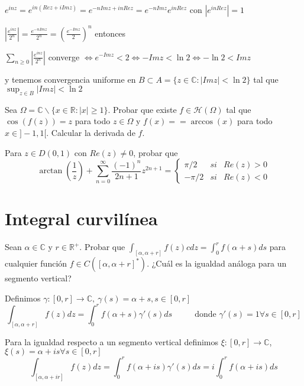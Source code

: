 $e^{inz} = e^{in(Rez+iImz)} = e^{-nImz+inRez} = e^{-nImz}e^{inRez}$ con $|e^{inRez}|=1$

$|\frac{e^{inz}}{2^n}| = \frac{e^{-nImz}}{2^n} = (\frac{e^{-Imz}}{2})^n$
entonces

$\sum_{n\geq 0} |\frac{e^{inz}}{2^n}|$ converge $\Longleftrightarrow e^{-Imz} < 2 \Longleftrightarrow -Imz < \ln 2 \Longleftrightarrow -\ln 2 < Imz$

y tenemos convergencia uniforme en $B\subset A= \{ z\in\mathbb{C} : |Imz|<\ln 2 \}$ tal que $\sup_{z\in B} |Imz| < \ln 2$


\begin{ejer}
	Sea $\Omega = \mathbb{C}\backslash\{ x\in\mathbb{R} : |x|\geq 1 \}$. Probar que existe $f\in\mathcal{H}(\Omega)$ tal que $\cos(f(z)) = z$ para todo $z\in\Omega$ y $f(x)==\arccos(x)$ para todo $x\in]-1,1[$. Calcular la derivada de $f$.
\end{ejer}


\begin{ejer}
	Para $z\in D(0,1)$ con $Re(z) \not =0$, probar que
	$$ \arctan\left(\frac{1}{z}\right) + \sum_{n=0}^{\infty} \frac{(-1)^n}{2n+1}z^{2n+1} = \left\{ \begin{array}{lcc}
	\pi/2  &   si  & Re(z)>0 \\
	-\pi/2 &  si & Re(z)<0 \end{array}
	\right. $$
\end{ejer}

\newpage


\section{Integral curvilínea}

\begin{ejer}
	Sean $\alpha\in\mathbb{C}$ y $r\in\mathbb{R}^+$. Probar que $\int_{[\alpha,\alpha+r]}f(z)cdz = \int_{0}^{r} f(\alpha +s)ds$ para cualquier función $f\in C([\alpha,\alpha+r]^{\ast})$. ¿Cuál es la igualdad análoga para un segmento vertical?
\end{ejer}

\begin{sol}
	
	Definimos $\gamma :[0,r] \rightarrow \mathbb{C}, \ \gamma (s) = \alpha + s, s\in[0,r]$
	$$\int_{[\alpha,\alpha + r]} f(z)dz = \int_{0}^{r} f(\alpha +s)\gamma ' (s)ds \hspace{1cm}\text{ donde }\gamma ' (s) = 1 \forall s\in [0,r]$$
	
	Para la igualdad respecto a un segmento vertical definimos $\xi : [0,r] \rightarrow \mathbb{C}$, $\xi(s) = \alpha +is \forall s\in[0,r]$
	$$\int_{[\alpha,\alpha + ir]} f(z)dz = \int_0^r f(\alpha + is) \gamma ' (s)ds = i\int_0^r f(\alpha +is)ds$$
	
\end{sol}



